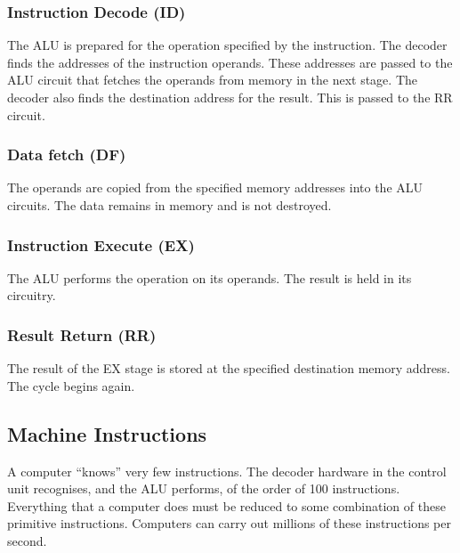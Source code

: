 \subsubsection{Instruction Decode (ID)}

The ALU is prepared for the operation specified by the instruction.
The decoder finds the addresses of the instruction operands.
These addresses are passed to the ALU circuit that fetches the operands from memory in the next stage.
The decoder also finds the destination address for the result.
This is passed to the RR circuit.

\subsubsection{Data fetch (DF)}

The operands are copied from the specified memory addresses into the ALU circuits.
The data remains in memory and is not destroyed.

\subsubsection{Instruction Execute (EX)}

The ALU performs the operation on its operands.
The result is held in its circuitry.

\subsubsection{Result Return (RR)}

The result of the EX stage is stored at the specified destination memory address.
The cycle begins again.

\subsection{Machine Instructions}

A computer ``knows'' very few instructions.
The decoder hardware in the control unit recognises, and the ALU performs, of the order of \num{100} instructions.
Everything that a computer does must be reduced to some combination of these primitive instructions.
Computers can carry out millions of these instructions per second.
